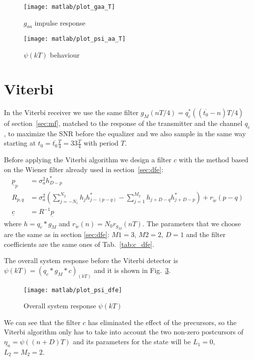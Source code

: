 \documentclass[a4paper,oneside]{article}
\renewcommand{\vec}[1]{\underline{#1}}
\begin{document}
\begin{figure}[h]
  \centering
  \texttt{[image: matlab/plot\_gaa\_T]}
  \caption{$g_{aa}$ impulse response}
  \label{plot:gaa}
\end{figure}

\begin{figure}[h]
  \centering
  \texttt{[image: matlab/plot\_psi\_aa\_T]}
  \caption{$\psi(kT)$ behaviour}
  \label{plot:gaa_psi_T}
\end{figure}

\section{Viterbi}
\label{sec:viterbi}
In the Viterbi receiver we use the same filter $g_M(nT/4) = q_c^*((\overline{t_0} - n)T/4)$ of
section~\ref{sec:mf}, matched to the response of
the transmitter and the channel $q_c$, to maximize the
  SNR before the equalizer and we also sample in the same way
starting at $t_0 = \overline{t_0}\frac{T}{4} = 33\frac{T}{4}$ with
period $T$.

Before applying the Viterbi algorithm we design a filter $c$ with the
method based on the Wiener filter already used in
section~\ref{sec:dfe}:
\begin{align}
  \vec{p}_p &= \sigma^2_ah^*_{D-p} \\
  R_{p,q} &= \sigma^2_a\left( \sum_{j=-N_1}^{N_2}h_jh^*_{j-(p-q)} - \sum_{j=1}^{M_2}h_{j+D-q}h^*_{j+D-p} \right) + r_{\tilde{w}}(p-q) \\
    \vec{c} &= R^{-1} \vec{p}
\end{align}
where $h = q_c * g_M$ and $r_{\tilde{w}}(n) = N_0 r_{g_M}(nT)$. The
parameters that we choose are the same as in section \ref{sec:dfe}:
$M1 = 3$, $M2 = 2$, $D=1$ and the filter coefficients are the same ones of
Tab.~\ref{tab:c_dfe}.

The overall system response before the Viterbi detector is $\psi(kT) =
(q_c * g_M * c)_{(kT)}$ and it is shown in Fig.~\ref{plot:psi_dfe}.
\begin{figure}[htbp]
  \centering
  \texttt{[image: matlab/plot\_psi\_dfe]}
  \caption{Overall system response $\psi(kT)$}
  \label{plot:psi_dfe}
\end{figure}
We can see that the filter $c$ has eliminated the effect of the
precursors, so the Viterbi algorithm only has to take into account the
two non-zero postcursors of $\eta_n = \psi((n+D)T)$ and its parameters
for the state will be $L_1 = 0$, $L_2 = M_2 = 2$.
\end{document}
